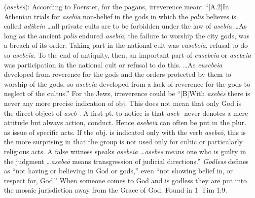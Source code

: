 \item[Godless,]

(\textit{asebēs}):
According to Foerster, for the pagans, irreverence meant ``[A.2]In Athenian trials for \emph{asebia} non-belief in the gods in which the \emph{polis} believes is called \emph{adikein} \ldots all private cults are to be forbidden under the law of \emph{asebia} \ldots As long as the ancient \emph{polis} endured \emph{asebia}, the failure to worship the city gods, was a breach of its order. Taking part in the national cult was \emph{eusebeia}, refusal to do so \emph{asebeia}. To the end of antiquity, then, an important part of \emph{eusebeia} or \emph{asebeia} was participation in the national cult or refusal to do this. \ldots As \emph{eusebeia} developed from reverence for the gods and the orders protected by them to worship of the gods, so \emph{asebeia} developed from a lack of reverence for the gods  to neglect of the cultus.''
For the Jews, irreverence could be ``[B]With \emph{asebēs} there is never any more precise indication of obj. This does not mean that only God is the direct object of \emph{aseb-}. A first pt. to notice is that \emph{aseb-} never denotes a mere attitude but always action, conduct. Hence \emph{asebeia} can often be put in the plur. as issue of specific acts. If the obj. is indicated only with the verb \emph{asebeō}, this is the more surprising in that the group is not used only for cultic or particularly religious acts. A false witness speaks \emph{asebeia} \ldots \emph{asebēs} means one who is guilty in the judgment \ldots \emph{asebeō} means transgression of judicial directions.''
\emph{Godless} defines as ``not having or believing in God or gods,'' even ``not showing belief in, or respect for, God.'' When someone comes to God and is godless they are put into the mosaic jurisdiction away from the Grace of God.
Found in 1~Tim 1:9.
